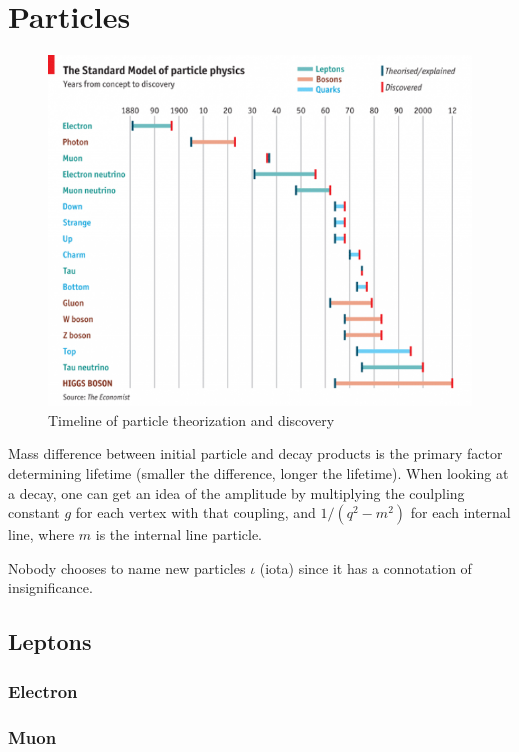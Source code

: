 \chapter{Particles}

\begin{figure}
\includegraphics[width=\textwidth]{physics/images/particle_timeline}
\caption{Timeline of particle theorization and discovery}
\end{figure}
Mass difference between initial particle and decay products is the primary factor determining lifetime (smaller the difference, longer the lifetime). When looking at a decay, one can get an idea of the amplitude by multiplying the coulpling constant $g$ for each vertex with that coupling, and $1/(q^2 - m^2)$ for each internal line, where $m$ is the internal line particle.

Nobody chooses to name new particles $\iota$ (iota) since it has a connotation of insignificance.




\section{Leptons}
\subsection{Electron}

\subsection{Muon}

